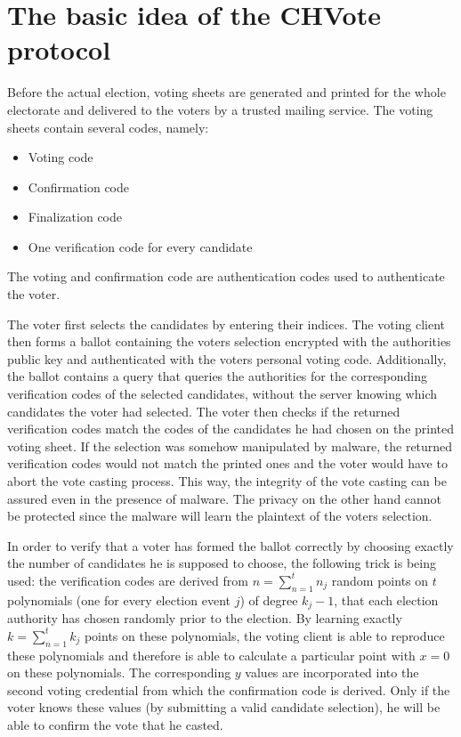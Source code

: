 \documentclass[a4paper,12pt]{report}
\begin{document}
\section{The basic idea of the CHVote protocol}
Before the actual election, voting sheets are generated and printed for the whole electorate and delivered to the voters by a trusted mailing service. The voting sheets contain several codes, namely:

\begin{itemize}
	\item Voting code
	\item Confirmation code
	\item Finalization code
	\item One verification code for every candidate
\end{itemize}

The voting and confirmation code are authentication codes used to authenticate the voter.

The voter first selects the candidates by entering their indices. The voting client then forms a ballot containing the voters selection encrypted with the authorities public key and authenticated with the voters personal voting code. Additionally, the ballot contains a query that queries the authorities for the corresponding verification codes of the selected candidates, without the server knowing which candidates the voter had selected. The voter then checks if the returned verification codes match the codes of the candidates he had chosen on the printed voting sheet. If the selection was somehow manipulated by malware, the returned verification codes would not match the printed ones and the voter would have to abort the vote casting process. This way, the integrity of the vote casting can be assured even in the presence of malware. The privacy on the other hand cannot be protected since the malware will learn the plaintext of the voters selection.

In order to verify that a voter has formed the ballot correctly by choosing exactly the number of candidates he is supposed to choose, the following trick is being used: the verification codes are derived from $n = \sum_{n=1}^{t} n_j$ random points on $t$ polynomials (one for every election event $j$) of degree $k_j - 1$, that each election authority has chosen randomly prior to the election. By learning exactly $k = \sum_{n=1}^{t} k_j$ points on these polynomials, the voting client is able to reproduce these polynomials and therefore is able to calculate a particular point with $x=0$ on these polynomials. The corresponding $y$ values are incorporated into the second voting credential from which the confirmation code is derived. Only if the voter knows these values (by submitting a valid candidate selection), he will be able to confirm the vote that he casted.
\end{document}
